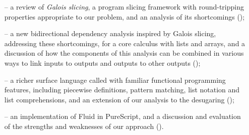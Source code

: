 \begin{itemize}[leftmargin=*]
   \item[--] a review of \emph{Galois slicing}, a program slicing framework with round-tripping properties appropriate to our problem, and an analysis of its shortcomings ();
   \item[--] a new bidirectional dependency analysis inspired by Galois slicing, addressing these shortcomings, for a core calculus with lists and arrays, and a discussion of how the components of this analysis can be combined in various ways to link inputs to outputs and outputs to other outputs ();
   \item[--] a richer surface language called \OurLanguage with familiar functional programming features, including piecewise definitions, pattern matching, list notation and list comprehensions, and an extension of our analysis to the desugaring ();
   \item[--] an implementation of Fluid in PureScript, and a discussion and evaluation of the strengths and weaknesses of our approach ().
\end{itemize}
